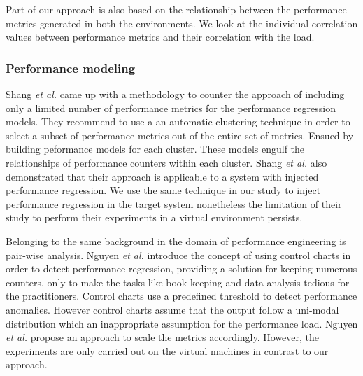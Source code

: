 Part of our approach is also based on the relationship between the performance metrics generated in both the environments. We look at the individual correlation values between performance metrics and their correlation with the load.


\subsubsection{Performance modeling}

Shang\textit{ et al.} \cite{Shang:2015:ADP:2668930.2688052} came up with a methodology to counter the approach of including only a limited number of performance metrics for the performance regression models. They recommend to use a an automatic clustering technique in order to select a subset of performance metrics out of the entire set of metrics. Ensued by building peformance models for each cluster. These models engulf the relationships of performance counters within each cluster. Shang\textit{ et al.} \cite{Shang:2015:ADP:2668930.2688052} also demonstrated that their approach is applicable to a system with injected performance regression. We use the same technique in our study to inject performance regression in the target system nonetheless the limitation of their study to perform their experiments in a virtual environment persists.

Belonging to the same background in the domain of performance engineering is pair-wise analysis. Nguyen \textit{et al.} \cite{Nguyen:2012:ADP:2188286.2188344} introduce the concept of using control charts in order to detect performance regression, providing a solution for keeping numerous counters, only to make the tasks like book keeping and data analysis tedious for the practitioners. Control charts use a predefined threshold to detect performance anomalies. However control charts assume that the output follow a uni-modal distribution which an inappropriate assumption for the performance load. Nguyen \textit{ et al.} propose an approach to scale the metrics accordingly. However, the experiments are only carried out on the virtual machines in contrast to our approach.

